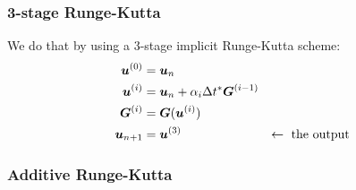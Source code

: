 \documentclass{article}
\newcommand{\todo}[1]{\textcolor{blue}{#1}}
\begin{document}
\subsubsection{3-stage Runge-Kutta}

We do that by using a 3-stage implicit Runge-Kutta scheme:
\begin{subequations}
\begin{align}
    \bm{u}^{(0)}        &= \bm{u}_{n} \\
    \bm{u}^{(i)}        &= \bm{u}_{n} + \alpha_i\Delta t^*\bm{G}^{(i-1)}
            \label{eq:smoother_with_precond} \\
    \bm{G}^{(i)}  &= \bm{G}(\bm{u}^{(i)}) \\
    \bm{u}_{n+1}        &= \bm{u}^{(3)} & \leftarrow \text{ the output}
\end{align}
\end{subequations}



\subsubsection{Additive Runge-Kutta}
\end{document}
